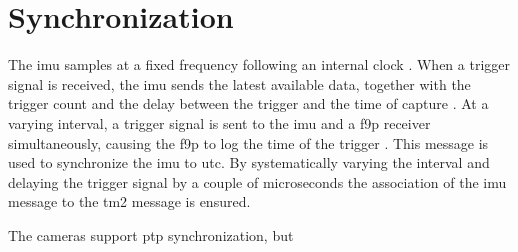 \section*{Synchronization}
The \gls{imu} samples at a fixed frequency following an internal clock \cite{safranSTIM300Datasheet}.
When a trigger signal is received, the \gls{imu} sends the latest available data, together with the trigger count and the delay between the trigger and the time of capture \cite{safranSTIM300Datasheet}.
At a varying interval, a trigger signal is sent to the \gls{imu} and a \gls{f9p} receiver simultaneously, causing the \gls{f9p} to log the time of the trigger \cite[190]{u-bloxZEDF9PInterfaceDescription}.
This message is used to synchronize the \gls{imu} to \gls{utc}.
By systematically varying the interval and delaying the trigger signal by a couple of microseconds the association of the \gls{imu} message to the \gls{tm2} message is ensured.

The cameras support \gls{ptp} synchronization, but




